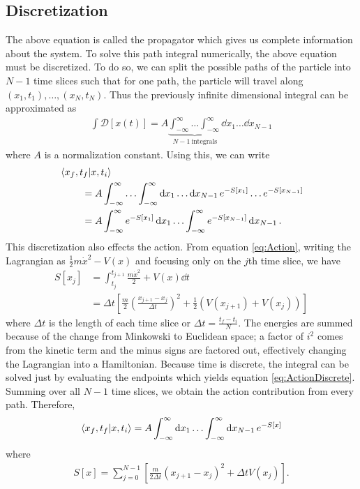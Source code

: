\documentclass[11pt]{article}
\begin{document}
\subsection{Discretization}
The above equation is called the propagator which gives us complete information about the system. To solve this path integral numerically, the above equation must be discretized. To do so, we can split the possible paths of the particle into $N-1$ time slices such that for one path, the particle will travel along $(x_1,t_1),\ldots,(x_N,t_N)$. Thus the previously infinite dimensional integral can be approximated as
\begin{align} 
	\int\mathcal{D}[x(t)]=A\underbrace{\int_{-\infty}^{\infty}\ldots\int_{-\infty}^{\infty}}_{N-1\ \text{integrals}}\dd{x_1}\ldots\dd{x_{N-1}}
\end{align}
where $A$ is a normalization constant. Using this, we can write
\begin{align}
\begin{split}
	&\bra{x_f,t_f}\ket{x,t_i}\\
	&\qquad\ =A\int_{-\infty}^{\infty}\ldots\int_{-\infty}^{\infty}\dd{x_1}\ldots\dd{x_{N-1}}e^{-S[x_1]}\ldots e^{-S[x_{N-1}]}\\
	&\qquad\ =A\int_{-\infty}^{\infty}e^{-S[x_1]}\dd{x_1}\ldots\int_{-\infty}^{\infty}e^{-S[x_{N-1}]}\dd{x_{N-1}}.
\end{split}
\end{align}
This discretization also effects the action. From equation \ref{eq:Action}, writing the Lagrangian as $\frac{1}{2}m\dot{x}^2-V(x)$ and focusing only on the $j$th time slice, we have 
\begin{align}
	S[x_j]&=\int_{t_j}^{t_{j+1}}\frac{m\dot{x}^2}{2}+V(x)\dd{t}\\
	&=\Delta t\left[\frac{m}{2}\left(\frac{x_{j+1}-x_j}{\Delta t}\right)^2+\frac{1}{2}(V(x_{j+1})+V(x_j))\right]
	\label{eq:ActionDiscrete}
\end{align}
where $\Delta t$ is the length of each time slice or $\Delta t=\frac{t_f-t_i}{N}$. The energies are summed because of the change from Minkowski to Euclidean space; a factor of $i^2$ comes from the kinetic term and the minus signs are factored out, effectively changing the Lagrangian into a Hamiltonian.  Because time is discrete, the integral can be solved just by evaluating the endpoints which yields equation \ref{eq:ActionDiscrete}. Summing over all $N-1$ time slices, we obtain the action contribution from every path. Therefore,
\begin{align}
	\bra{x_f,t_f}\ket{x,t_i}=A\int_{-\infty}^{\infty}\dd{x_1}\ldots\int_{-\infty}^{\infty}\dd{x_{N-1}}e^{-S[x]}
	\label{eq:PathIntNum}
\end{align}
where
\begin{align}
	S[x]=\sum_{j=0}^{N-1}\left[\frac{m}{2\Delta t}(x_{j+1}-x_j)^2+\Delta tV(x_j)\right].
	\label{eq:ActionTot}
\end{align}
\end{document}
